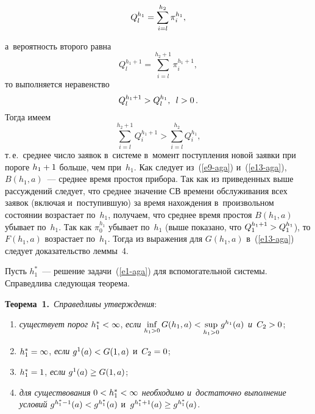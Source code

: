 \begin{multicols}{2}
\noindent
$$
Q_l^{h_1}\hm= \sum\limits^{h_2}_{i=l} \pi_i^{h_1},
$$

\noindent
 а~ве\-ро\-ят\-ность второго рав\-на 
$$
Q_l^{h_1+1} = \sum\limits_{i=l}^{h_2+1} \pi_i^{h_1+1},
$$ 
то выполняется неравенство 
$$
Q_l^{h_1+1}> Q_l^{h_1},\enskip l>0\,.
$$
 Тогда 
имеем 
$$
\sum\limits_{i=l}^{h_2+1} Q_i^{h_1+1}> \sum\limits^{h_2}_{i=l} 
Q_i^{h_1},
$$
 т.\,е.\ сред\-нее чис\-ло заявок в~сис\-те\-ме в~момент по\-ступ\-ле\-ния 
новой заявки при пороге $h_1\hm+1$ больше, чем при~$h_1$. Как следует 
  из~(\ref{e9-aga}) и~(\ref{e13-aga}), $B(h_1,a)$~--- сред\-нее время простоя 
прибора. Так как из приведенных выше рассуждений следует, что среднее 
значение СВ времени обслуживания всех заявок (включая 
и~по\-сту\-пив\-шую) за время на\-хож\-де\-ния в~произвольном со\-сто\-янии воз\-рас\-та\-ет 
по~$h_1$, получаем, что сред\-нее время простоя  $B(h_1,a)$ убывает по~$h_1$. 
Так как $\pi_0^{h_1}$ убывает по~$h_1$ (выше показано, что 
$Q_1^{h_1+1}\hm> Q_1^{h_1}$), то $F(h_1,a)$ возрастает по~$h_1$. Тогда из 
выражения для $G(h_1,a)$ в~(\ref{e13-aga}) следует доказательство леммы~4. 
  
  Пусть $h_1^*$~--- решение задачи~(\ref{e1-aga}) для вспомогательной 
сис\-те\-мы. Справедлива сле\-ду\-ющая тео\-рема.
  
  \smallskip
  
  \noindent
  \textbf{Теорема~1.}\ \textit{Справедливы утверж\-де\-ния}: 
  \begin{enumerate}[(1)]
  \item \textit{существует порог}  $h_1^*\hm<\infty$, 
  \textit{если  $\mathop{\mathrm{\inf}}\limits_{h_1>0} G(h_1,a)\hm< 
  \mathop{\mathrm{sup}}\limits_{h_1>0} g^{h_1}(a)$  и~$C_2\hm>0$}; 
 \item  $h_1^*\hm=\infty$, \textit{если} $g^1(a)\hm< G(1,a)$ и~$C_2\hm=0$; 
\item $h_1^*\hm=1$, \textit{если} $g^1(a)\hm\geq G(1,a)$; 
\item \textit{для существования $0\hm< h_1^*\hm< \infty$
  необходимо и~достаточно выполнение условий} 
  $g^{h_1^*-1}(a)\hm< g^{h_1^*}(a)$ и~$g^{h_1^*+1}(a)\hm\geq g^{h_1^*}(a)$.
  \end{enumerate}
  
  

\end{multicols}
